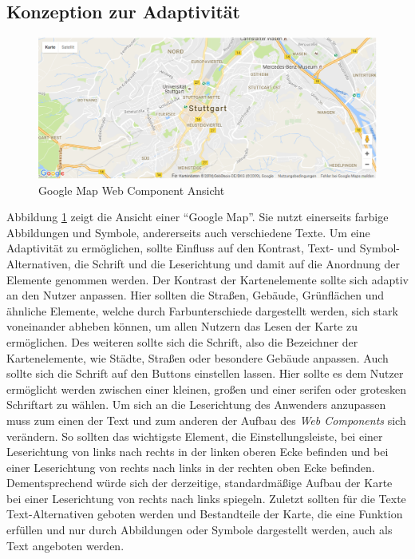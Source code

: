 \documentclass[12pt, paper=a4, bibtotoc, toc=listof, headsepline=true]{scrreprt}
\begin{document}
	\subsection{Konzeption zur Adaptivität}
	\label{ref:konVonAda}
	\begin{figure}			\centering
		\includegraphics[width=\textwidth,height=\textheight,keepaspectratio]{gmap.png}
		\caption[Google Map Web Component]{Google Map Web Component Ansicht}
		\label{img:gmap}
	\end{figure}
	Abbildung \ref{img:gmap} zeigt die Ansicht einer \enquote{Google Map}. Sie nutzt einerseits farbige Abbildungen und Symbole, andererseits auch verschiedene Texte. Um eine Adaptivität zu ermöglichen, sollte Einfluss auf den Kontrast, Text- und Symbol-Alternativen, die Schrift und die Leserichtung und damit auf die Anordnung der Elemente genommen werden. Der Kontrast der Kartenelemente sollte sich adaptiv an den Nutzer anpassen. Hier sollten die Straßen, Gebäude, Grünflächen und ähnliche Elemente, welche durch Farbunterschiede dargestellt werden, sich stark voneinander abheben können, um allen Nutzern das Lesen der Karte zu ermöglichen. Des weiteren sollte sich die Schrift, also die Bezeichner der Kartenelemente, wie Städte, Straßen oder besondere Gebäude anpassen. Auch sollte sich die Schrift auf den Buttons einstellen lassen. Hier sollte es dem Nutzer ermöglicht werden zwischen einer kleinen, großen und einer serifen oder grotesken Schriftart zu wählen. Um sich an die Leserichtung des Anwenders anzupassen muss zum einen der Text und zum anderen der Aufbau des \emph{Web Components} sich verändern. So sollten das wichtigste Element, die Einstellungsleiste, bei einer Leserichtung von links nach rechts in der linken oberen Ecke befinden und bei einer Leserichtung von rechts nach links in der rechten oben Ecke befinden. Dementsprechend würde sich der derzeitige, standardmäßige Aufbau der Karte bei einer Leserichtung von rechts nach links spiegeln. Zuletzt sollten für die Texte Text-Alternativen geboten werden und Bestandteile der Karte, die eine Funktion erfüllen und nur durch Abbildungen oder Symbole dargestellt werden, auch als Text angeboten werden. 
\end{document}
